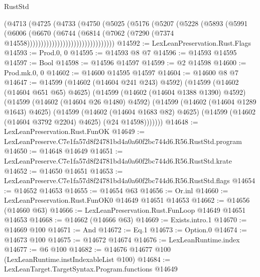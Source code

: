 \begin{lexlean}{RustStd}
\begin{coremodule}
                                  (@4713
                                    (@4725
                                      (@4733
                                        (@4750
                                          (@5025
                                            (@5176
                                              (@5207
                                                (@5228
                                                  (@5893
                                                    (@5991
                                                      (@6006
                                                        (@6670
                                                          (@6744
                                                            (@6814
                                                              (@7062
                                                                (@7290
                                                                  (@7374
                                                                    @14558))))))))))))))))))))))))))))))))
@14592 := LexLeanPreservation.Rust.Flags
@14593 := Prod.{0, 0}
@14595 := @14593 @8 @7
@14596 := @14593 @14595
@14597 := Bool
@14598 := @14596 @14597
@14599 := @2 @14598
@14600 := Prod.mk.{0, 0}
@14602 := @14600 @14595 @14597
@14604 := @14600 @8 @7
@14647 := @14599
    (@14602 (@14604 @241 @243) @4592)
    (@14599
      (@14602 (@14604 @651 @65) @4625)
      (@14599
        (@14602 (@14604 @1388 @1390) @4592)
        (@14599
          (@14602 (@14604 @26 @1480) @4592)
          (@14599
            (@14602 (@14604 @1289 @1643) @4625)
            (@14599
              (@14602 (@14604 @1683 @82) @4625)
              (@14599 (@14602 (@14604 @3792 @2204) @4625) (@24 @14598)))))))
@14648 := LexLeanPreservation.Rust.FunOK
@14649 := LexLeanPreserve.C7e1fa57d8f24781bd4a0a60f2bc744d6.R56.RustStd.program
@14650 := @14648 @14649
@14651 := LexLeanPreserve.C7e1fa57d8f24781bd4a0a60f2bc744d6.R56.RustStd.krate
@14652 := @14650 @14651
@14653 := LexLeanPreserve.C7e1fa57d8f24781bd4a0a60f2bc744d6.R56.RustStd.flags
@14654 := @14652 @14653
@14655 := @14654 @63
@14656 := Or.inl
@14660 := LexLeanPreservation.Rust.FunOK0 @14649 @14651 @14653
@14662 := @14656 (@14660 @63)
@14666 := LexLeanPreservation.Rust.FunLoop @14649 @14651 @14653
@14668 := @14662 (@14666 @63)
@14669 := Exists.intro.{1}
@14670 := @14669 @100
@14671 := And
@14672 := Eq.{1}
@14673 := Option.{0}
@14674 := @14673 @100
@14675 := @14672 @14674
@14676 := LexLeanRuntime.index
@14677 := @6 @100
@14682 := @14676 @14677 @100 (LexLeanRuntime.instIndexableList @100)
@14684 := LexLeanTarget.TargetSyntax.Program.functions @14649

\end{coremodule}
\end{lexlean}

